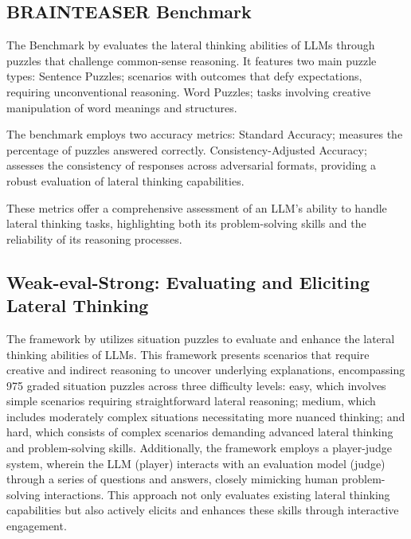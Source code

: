 \subsection{BRAINTEASER Benchmark}

The  Benchmark by \textcite{jiangBRAINTEASERLateralThinking2023} evaluates the lateral thinking abilities of \acp{LLM} through puzzles that challenge common-sense reasoning. It features two main puzzle types: Sentence Puzzles; scenarios with outcomes that defy expectations, requiring unconventional reasoning. Word Puzzles; tasks involving creative manipulation of word meanings and structures.

The benchmark employs two accuracy metrics: Standard Accuracy; measures the percentage of puzzles answered correctly. Consistency-Adjusted Accuracy; assesses the consistency of responses across adversarial formats, providing a robust evaluation of lateral thinking capabilities.

These metrics offer a comprehensive assessment of an \ac{LLM}'s ability to handle lateral thinking tasks, highlighting both its problem-solving skills and the reliability of its reasoning processes.

\subsection{Weak-eval-Strong: Evaluating and Eliciting Lateral Thinking}

The  framework by \textcite{haoRecentProgressLeveraging2022} utilizes situation puzzles to evaluate and enhance the lateral thinking abilities of LLMs. This framework presents scenarios that require creative and indirect reasoning to uncover underlying explanations, encompassing 975 graded situation puzzles across three difficulty levels: easy, which involves simple scenarios requiring straightforward lateral reasoning; medium, which includes moderately complex situations necessitating more nuanced thinking; and hard, which consists of complex scenarios demanding advanced lateral thinking and problem-solving skills. Additionally, the framework employs a player-judge system, wherein the LLM (player) interacts with an evaluation model (judge) through a series of questions and answers, closely mimicking human problem-solving interactions. This approach not only evaluates existing lateral thinking capabilities but also actively elicits and enhances these skills through interactive engagement.

